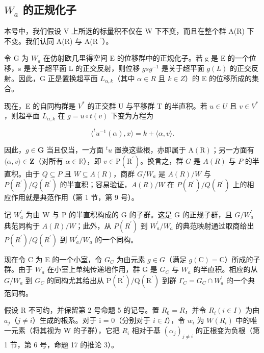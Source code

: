 \subsection{\texorpdfstring{\(W_{a}\) 的正规化子}{W\_a 的正规化子}}

本号中，我们假设 V 上所选的标量积不仅在 W 下不变，而且在整个群 A(R) 下不变。我们认同 A(R) 与 A(R \(^{\prime}\)）。

令 G 为 \(W_{a}\) 在仿射欧几里得空间 E 的位移群中的正规化子。若 g 是 E 的一个位移，s 是关于超平面 L 的正交反射，则位移 \(gsg^{-1}\) 是关于超平面 \(g(L)\) 的正交反射。因此，G 正是置换超平面 \(L_{\alpha,k}\)（其中 \(\alpha \in R\) 且 \(k \in Z\)）的 E 的位移所成的集合。

现在，E 的自同构群是 \(V^{*}\) 的正交群 U 与平移群 T 的半直积。若 \(u \in U\) 且 \(v \in V^{*}\)，则超平面 \(L_{\alpha,k}\) 在 \(g = u \circ t(v)\) 下变为方程为

\[
\langle^ {t} u ^ {- 1} (\alpha), x \rangle = k + \langle \alpha , v \rangle .
\]

因此，\(g \in \mathbf{G}\) 当且仅当，一方面 \({}^t u\) 置换这些根，亦即属于 \(\mathrm{A(R)}\)；另一方面有 \(\langle \alpha, v \rangle \in \mathbf{Z}\)（对所有 \(\alpha \in \mathbb{R}\)），即 \(v \in \mathrm{P(R^{\prime})}\)。换言之，群 \(G\) 是 \(A(R)\) 与 \(P\) 的半直积。由于 \(Q \subseteq P\) 且 \(W \subseteq A(R)\)，商群 \(G / W_a\) 是 \(A(R)/W\) 与 \(P(R^{\prime})/Q(R^{\prime})\) 的半直积；容易验证，\(A(R)/W\) 在 \(P(R^{\prime})/Q(R^{\prime})\) 上的相应作用就是典范作用（第 1 节，第 9 号）。

记 \(W_{a}^{\prime}\) 为由 W 与 P 的半直积构成的 G 的子群。这是 G 的正规子群，且 \(G/W_{a}^{\prime}\) 典范同构于 \(A(R)/W\)；此外，从 \(P(R^{\prime})\) 到 \(W_{a}^{\prime}/W_{a}\) 的典范映射通过取商给出 \(P(R^{\prime})/Q(R^{\prime})\) 到 \(W_{a}^{\prime}/W_{a}\) 的一个同构。

现在令 C 为 E 的一个小室，令 \(G_{C}\) 为由元素 \(g \in G\)（满足 \(g(\mathrm{C}) = \mathrm{C}\)）所成的子群。由于 \(W_{a}\) 在小室上单纯传递地作用，群 G 是 \(G_{C}\) 与 \(W_{a}\) 的半直积。相应的从 \(G/W_{a}\) 到 \(G_{C}\) 的同构尤其给出从 \(\mathrm{P}(\mathrm{R}^{\prime})/\mathrm{Q}(\mathrm{R}^{\prime})\) 到群 \(\Gamma_{C} = G_{C} \cap W_{a}^{\prime}\) 的一个典范同构。

假设 R 不可约，并保留第 2 号命题 5 的记号。置 \(R_{0} = R\)，并令 \(R_{i} (i \in I)\) 为由 \(a_{j}\)（\(j \neq i\)）生成的根系。对于 i = 0（分别对于 \(i \in I\)），令 \(w_{i}\) 为 \(W(R_{i})\) 中的唯一元素（将其视为 W 的子群），它把 \(R_{i}\) 相对于基 \((\alpha_{j})_{j \neq i}\) 的正根变为负根（第 1 节，第 6 号，命题 17 的推论 3）。


